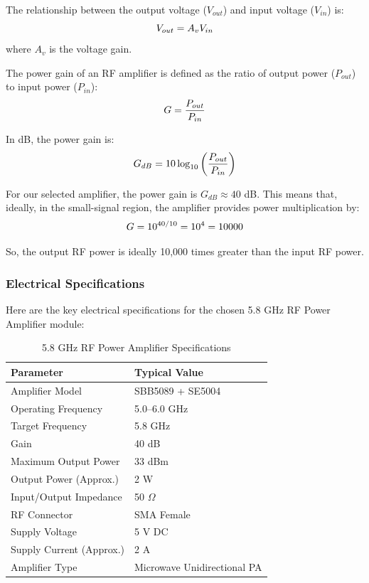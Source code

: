\documentclass[12pt,a4paper]{report}
\begin{document}
	The relationship between the output voltage ($V_{out}$) and input voltage ($V_{in}$) is:
	\begingroup
	\setlength{\mathindent}{0pt}
	\begin{equation*}
		\hfill
		V_{out} = A_v V_{in}
		\hfill
	\end{equation*}
	\endgroup
	where $A_v$ is the voltage gain.
	
	The power gain of an RF amplifier is defined as the ratio of output power ($P_{out}$) to input power ($P_{in}$):
	\begingroup
	\setlength{\mathindent}{0pt}
	\begin{equation*}
		\hfill
		G = \frac{P_{out}}{P_{in}}
		\hfill
	\end{equation*}
	\endgroup
	
	In dB, the power gain is:
	\begingroup
	\setlength{\mathindent}{0pt}
	\begin{equation*}
		\hfill
		G_{dB} = 10 \log_{10}\left(\frac{P_{out}}{P_{in}}\right)
		\hfill
	\end{equation*}
	\endgroup
	
	For our selected amplifier, the power gain is $G_{dB} \approx 40$ dB. This means that, ideally, in the small-signal region, the amplifier provides power multiplication by:
	\begingroup
	\setlength{\mathindent}{0pt}
	\begin{equation*}
		\hfill
		G = 10^{40/10} = 10^4 = 10000
		\hfill
	\end{equation*}
	\endgroup
	
	So, the output RF power is ideally 10,000 times greater than the input RF power.
	\subsubsection{Electrical Specifications}
	Here are the key electrical specifications for the chosen 5.8 GHz RF Power Amplifier module:
	
	\begin{table}[htbp]
		\centering
		\caption{5.8 GHz RF Power Amplifier Specifications}
		\label{tab:pa_specs}
		\begin{tabular}{p{5cm} p{5cm}}
			\toprule
			\textbf{Parameter} & \textbf{Typical Value} \\
			\midrule
			Amplifier Model & SBB5089 + SE5004 \\
			Operating Frequency & 5.0--6.0 GHz \\
			Target Frequency & 5.8 GHz \\
			Gain & 40 dB \\
			Maximum Output Power & 33 dBm \\
			Output Power (Approx.) & 2 W \\
			Input/Output Impedance & 50 $\Omega$ \\
			RF Connector & SMA Female \\
			Supply Voltage & 5 V DC \\
			Supply Current (Approx.) & 2 A \\
			Amplifier Type & Microwave Unidirectional PA \\
			\bottomrule
		\end{tabular}
	\end{table}
\end{document}
